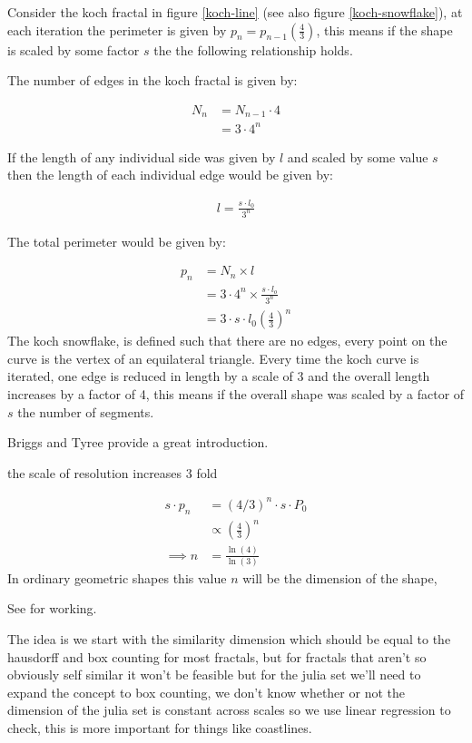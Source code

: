 \documentclass[11pt]{article}
\begin{document}
Consider the koch fractal in figure \ref{koch-line} (see also figure \ref{koch-snowflake}), at each iteration the perimeter is given by \(p_{n}=p_{n-1}  \left(\frac{4}{3} \right)\), this means if the shape is scaled by some factor \(s\) the the following relationship holds.

The number of edges in the koch fractal is given by:

\begin{align}
N_{n} &= N_{n-1} \cdot 4 \\
&= 3 \cdot 4^{n}
\end{align}

If the length of any individual side was given by \(l\) and scaled by some value \(s\) then the length of each individual edge would be given by:

\begin{align}
l = \frac{s \cdot l_{0}}{3^{n}}
\end{align}

The total perimeter would be given by:

\begin{align}
p_{n} &= N_{n} \times l \\
&= 3\cdot 4^{n} \times \frac{s \cdot l_{o}}{3^{n}} \\
&= 3 \cdot s \cdot  l_{0} \left( \frac{4}{3} \right)^{n}
\end{align}
The koch snowflake, is defined such that there are no edges, every point on the curve is the vertex of an equilateral triangle. Every time the koch curve is iterated, one edge is reduced in length by a scale of 3 and the overall length increases by a factor of 4, this means if the overall shape was scaled by a factor of \(s\) the number of segments.

Briggs and Tyree provide a great introduction.

the scale of resolution increases 3 fold

\begin{align}
s \cdot p_{n} &=  (4/3)^{n} \cdot s \cdot P_{0}\\
& \propto \left(\frac{4}{3}\right)^{n} \\
 \implies  n &= \frac{\ln\left( 4 \right)}{\ln\left( 3 \right)} \label{eq:koch-dim}
\end{align}
In ordinary geometric shapes this value \(n\) will be the dimension of the shape,

See \cite[p. 414]{strogatzNonlinearDynamicsChaos2015} for working.

The idea is we start with the similarity dimension
\cite[p. 413]{strogatzNonlinearDynamicsChaos2015} which should be equal to the
hausdorff and box counting for most fractals, but for fractals that aren't so obviously self similar it won't be feasible \cite[p. 393]{liIntegrationFuzzyLogic2006}  but for the julia set we'll need
to expand the concept to box counting, we don't know whether or not the
dimension of the julia set is constant across scales so we use linear regression
to check, this is more important for things like coastlines.
\end{document}
